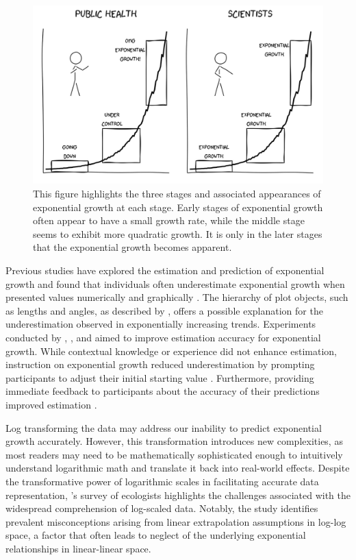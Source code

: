 \documentclass[12pt]{article}
\begin{document}
\begin{figure}[tbp]

{\centering \includegraphics[width=1\linewidth,]{images/exponential-stages-comic} 

}

\caption{This figure highlights the three stages and associated appearances of exponential growth at each stage. Early stages of exponential growth often appear to have a small growth rate, while the middle stage seems to exhibit more quadratic growth. It is only in the later stages that the exponential growth becomes apparent.}\label{fig:exponential-stages}
\end{figure}

Previous studies have explored the estimation and prediction of
exponential growth and found that individuals often underestimate
exponential growth when presented values numerically and graphically
\citep{wagenaar_misperception_1975}. The hierarchy of plot objects, such
as lengths and angles, as described by \citet{cleveland_graphical_1985},
offers a possible explanation for the underestimation observed in
exponentially increasing trends. Experiments conducted by
\citet{wagenaar_misperception_1975}, \citet{jones_polynomial_1977}, and
\citet{mackinnon_feedback_1991} aimed to improve estimation accuracy for
exponential growth. While contextual knowledge or experience did not
enhance estimation, instruction on exponential growth reduced
underestimation by prompting participants to adjust their initial
starting value
\citep{wagenaar_misperception_1975, jones_polynomial_1977}. Furthermore,
providing immediate feedback to participants about the accuracy of their
predictions improved estimation \citep{mackinnon_feedback_1991}.

Log transforming the data may address our inability to predict
exponential growth accurately. However, this transformation introduces
new complexities, as most readers may need to be mathematically
sophisticated enough to intuitively understand logarithmic math and
translate it back into real-world effects. Despite the transformative
power of logarithmic scales in facilitating accurate data
representation, \citet{menge_logarithmic_2018}'s survey of ecologists
highlights the challenges associated with the widespread comprehension
of log-scaled data. Notably, the study identifies prevalent
misconceptions arising from linear extrapolation assumptions in log-log
space, a factor that often leads to neglect of the underlying
exponential relationships in linear-linear space.
\end{document}
